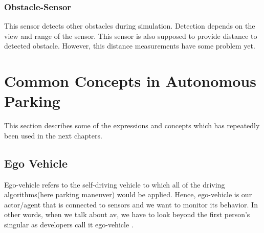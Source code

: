 \subsubsection{Obstacle-Sensor}
This sensor detects other obstacles during simulation. Detection depends on the view and range of the sensor. This sensor is also supposed to provide distance to detected obstacle. However, this distance measurements have some problem yet.
\section{Common Concepts in Autonomous Parking}\label{concepts}
This section describes some of the expressions and concepts which has repeatedly been used in the next chapters.
\subsection{Ego Vehicle}
Ego-vehicle refers to the self-driving vehicle to which all of the driving algorithms(here parking maneuver) would be applied. Hence, ego-vehicle is our actor/agent that is connected to sensors and we want to monitor its behavior. In other words, when we talk about \acrlong{av}, we have to look beyond the first person's singular as developers call it ego-vehicle \cite{egoVehicle}.
